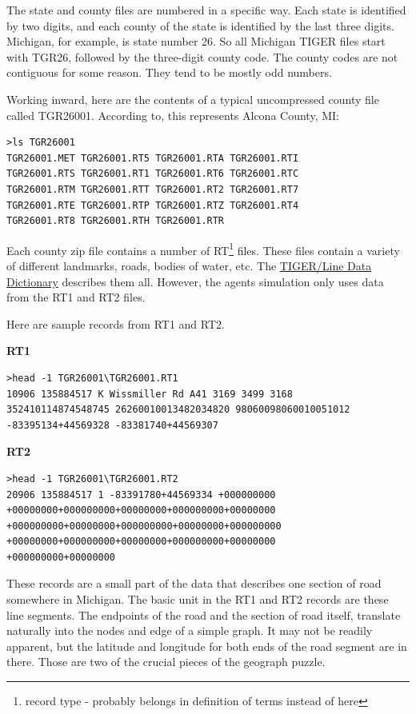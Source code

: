 \documentclass[11pt,letterpaper,onecolumn,twoside,openright,final]{report}
\begin{document}
The state and county files are numbered in a specific way.
Each state is identified by two digits, and each county of the state is identified by the last three digits.
Michigan, for example, is state number 26.
So all Michigan TIGER files start with TGR26, followed by the three-digit county code.
The county codes are not contiguous for some reason.
They tend to be mostly odd numbers.

Working inward, here are the contents of a typical uncompressed county file called TGR26001.
According to, this represents Alcona County, MI:


\begin{verbatim}
>ls TGR26001
TGR26001.MET TGR26001.RT5 TGR26001.RTA TGR26001.RTI
TGR26001.RTS TGR26001.RT1 TGR26001.RT6 TGR26001.RTC
TGR26001.RTM TGR26001.RTT TGR26001.RT2 TGR26001.RT7
TGR26001.RTE TGR26001.RTP TGR26001.RTZ TGR26001.RT4
TGR26001.RT8 TGR26001.RTH TGR26001.RTR
\end{verbatim}


Each county zip file contains a number of RT\footnote{record type - probably belongs in definition of terms instead of here} files.
These files contain a variety of different landmarks, roads, bodies of water, etc.
The \href{http://www.census.gov/geo/www/tiger/tiger2006se/a6sech6.txt}{TIGER/Line Data Dictionary} describes them all.
However, the agents simulation only uses data from the RT1 and RT2 files.

Here are sample records from RT1 and RT2.

\textbf{RT1}
\begin{verbatim}
>head -1 TGR26001\TGR26001.RT1
10906 135884517 K Wissmiller Rd A41 3169 3499 3168
352410114874548745 26260010013482034820 98060098060010051012
-83395134+44569328 -83381740+44569307
\end{verbatim}

\textbf{RT2}
\begin{verbatim}
>head -1 TGR26001\TGR26001.RT2
20906 135884517 1 -83391780+44569334 +000000000
+00000000+000000000+00000000+000000000+00000000
+000000000+00000000+000000000+00000000+000000000
+00000000+000000000+00000000+000000000+00000000
+000000000+00000000
\end{verbatim}

These records are a small part of the data that describes one section of road somewhere in Michigan.
The basic unit in the RT1 and RT2 records are these line segments.
The endpoints of the road and the section of road itself, translate naturally into the nodes and edge of a simple graph.
It may not be readily apparent, but the latitude and longitude for both ends of the road segment are in there.
Those are two\cite{colu92} of the crucial pieces of the geograph puzzle.
\end{document}
